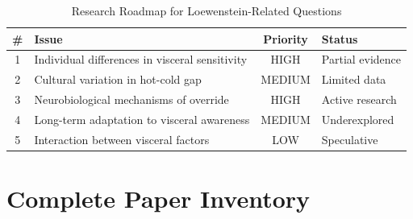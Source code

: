 \begin{table}[htbp]
\centering
\caption{Research Roadmap for Loewenstein-Related Questions}
\label{tab:lo-roadmap}
\renewcommand{\arraystretch}{1.3}
\begin{tabular}{@{}clcl@{}}
\toprule
\textbf{\#} & \textbf{Issue} & \textbf{Priority} & \textbf{Status} \\
\midrule
1 & Individual differences in visceral sensitivity & HIGH & Partial evidence \\
2 & Cultural variation in hot-cold gap & MEDIUM & Limited data \\
3 & Neurobiological mechanisms of override & HIGH & Active research \\
4 & Long-term adaptation to visceral awareness & MEDIUM & Underexplored \\
5 & Interaction between visceral factors & LOW & Speculative \\
\bottomrule
\end{tabular}
\end{table}


\section{Complete Paper Inventory}
\label{sec:lo-papers}

